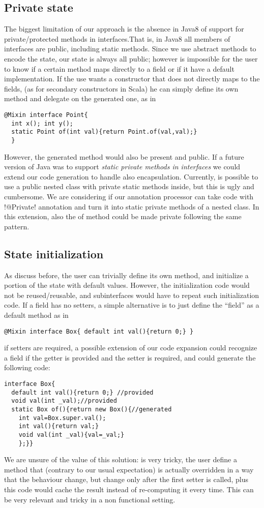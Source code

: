 \subsection{Private state}
The biggest limitation of our approach is the absence in Java8 of support for private/protected methods in interfaces.That is, in Java8 all members of interfaces are public, including static methods.
Since we use abstract methods to encode the state, our state is always all public; however is impossible for the user to know if a certain method maps directly to a field or if it have a default implementation.
If the use wants a constructor that does not directly maps to the fields, (as for secondary constructors in Scala) he can simply define its own \Q@of@ method and delegate on the generated one, as in
\begin{lstlisting}
@Mixin interface Point{
  int x(); int y();
  static Point of(int val){return Point.of(val,val);}  
  }
\end{lstlisting}
However, the generated \Q@of@ method would also be present and public.
If a future version of Java was to support \emph{static private methods in interfaces} we could extend our code generation to handle also encapsulation.
Currently, is possible to use a public nested class with private static methods inside, but this is ugly and cumbersome. We are considering if our annotation processor can take code with \Q!@Private! annotation and turn it into static private methods of a nested class. In this extension,  also the of method could be made private following the same pattern. 

\subsection{State initialization}

As discuss before, the user can trivially define its own \Q@of@ method, and initialize a portion of the state with default values.
However, the initialization code would not be reused/reusable, and subinterfaces would have to repeat such initialization code.
If a field has no setters, a simple alternative is to just define the ``field'' as a default method as in 
\begin{lstlisting}
@Mixin interface Box{ default int val(){return 0;} }
\end{lstlisting}
if setters are required, a possible extension of our code expansion could recognize a field if the getter is provided and the setter is required, and could generate the following code:
\begin{lstlisting}
interface Box{ 
  default int val(){return 0;} //provided
  void val(int _val);//provided
  static Box of(){return new Box(){//generated
    int val=Box.super.val();
    int val(){return val;}
    void val(int _val){val=_val;}
    };}}
\end{lstlisting}
We are unsure of the value of this solution: is very tricky, the user define a method that (contrary to our usual expectation) is actually overridden in a way that the behaviour change, but change only after the first setter is called, plus this code would cache the result instead of re-computing it every time. This can be very relevant and tricky in a non functional setting.

